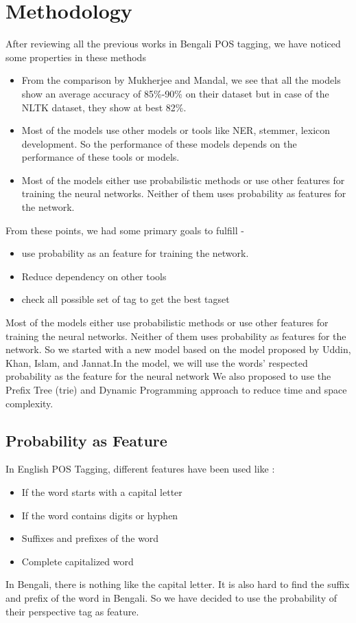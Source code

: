 \documentclass{standalone}
\begin{document}
\chapter{Methodology}
\label{chap:method}
After reviewing all the previous works in Bengali POS tagging, we have noticed some properties in these methods
\begin{itemize}
    \item  From the comparison by Mukherjee and Mandal\cite{mukherjee}, we see that all the models show an average accuracy of 85\%-90\% on their dataset but in case of the NLTK dataset, they show at best 82\%. 
    \item Most of the models use other models or tools like NER, stemmer, lexicon development. So the performance of these models depends on the performance of these tools or models. 
    \item Most of the models either use probabilistic methods or use other features for training the neural networks. Neither of them uses probability as features for the network.

\end{itemize}
From these points, we had some primary goals to fulfill -
\begin{itemize}
    \item use probability as an feature for training the network. 
    \item Reduce dependency on other tools
    \item check all possible set of tag to get the best tagset
\end{itemize}
Most of the models either use probabilistic methods or use other features for training the neural networks. Neither of them uses probability as features for the network. So we started with a new model based on the model proposed by Uddin, Khan, Islam, and Jannat\cite{uddin}.In the model, we will use the words’ respected probability as the feature for the neural network We also proposed to use the Prefix Tree (trie) and Dynamic Programming approach to reduce time and space complexity.
\section{Probability as Feature}
\label{feature}
In English POS Tagging, different features have been used like :
\begin{itemize}
    \item If the word starts with a capital letter
    \item If the word contains digits or hyphen
    \item Suffixes and prefixes of the word
    \item Complete capitalized word
\end{itemize}
In Bengali, there is nothing like the capital letter. It is also hard to find the suffix and prefix of the word in Bengali. So we have decided to use the probability of their perspective tag as feature.
\end{document}
